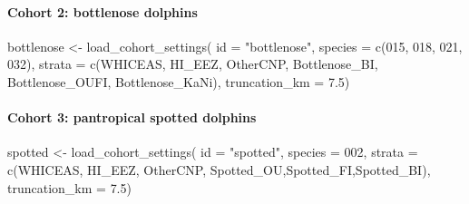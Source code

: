 \documentclass[
]{book}
\newenvironment{Shaded}{\begin{snugshade}}{\end{snugshade}}
\newcommand{\AttributeTok}[1]{\textcolor[rgb]{0.77,0.63,0.00}{#1}}
\newcommand{\FloatTok}[1]{\textcolor[rgb]{0.00,0.00,0.81}{#1}}
\newcommand{\FunctionTok}[1]{\textcolor[rgb]{0.00,0.00,0.00}{#1}}
\newcommand{\NormalTok}[1]{#1}
\newcommand{\OtherTok}[1]{\textcolor[rgb]{0.56,0.35,0.01}{#1}}
\newcommand{\StringTok}[1]{\textcolor[rgb]{0.31,0.60,0.02}{#1}}
\begin{document}
\hypertarget{cohort-2-bottlenose-dolphins}{%
\paragraph*{Cohort 2: bottlenose dolphins}\label{cohort-2-bottlenose-dolphins}}

\begin{Shaded}
\begin{Highlighting}[]
\NormalTok{bottlenose }\OtherTok{\textless{}{-}} \FunctionTok{load\_cohort\_settings}\NormalTok{(}
  \AttributeTok{id =} \StringTok{"bottlenose"}\NormalTok{,}
  \AttributeTok{species =} \FunctionTok{c}\NormalTok{(}\StringTok{\textquotesingle{}015\textquotesingle{}}\NormalTok{, }\StringTok{\textquotesingle{}018\textquotesingle{}}\NormalTok{, }\StringTok{\textquotesingle{}021\textquotesingle{}}\NormalTok{, }\StringTok{\textquotesingle{}032\textquotesingle{}}\NormalTok{),}
  \AttributeTok{strata =} \FunctionTok{c}\NormalTok{(}\StringTok{\textquotesingle{}WHICEAS\textquotesingle{}}\NormalTok{, }\StringTok{\textquotesingle{}HI\_EEZ\textquotesingle{}}\NormalTok{, }\StringTok{\textquotesingle{}OtherCNP\textquotesingle{}}\NormalTok{,}
             \StringTok{\textquotesingle{}Bottlenose\_BI\textquotesingle{}}\NormalTok{, }\StringTok{\textquotesingle{}Bottlenose\_OUFI\textquotesingle{}}\NormalTok{, }\StringTok{\textquotesingle{}Bottlenose\_KaNi\textquotesingle{}}\NormalTok{),}
  \AttributeTok{truncation\_km =} \FloatTok{7.5}\NormalTok{)}
\end{Highlighting}
\end{Shaded}

\hypertarget{cohort-3-pantropical-spotted-dolphins}{%
\paragraph*{Cohort 3: pantropical spotted dolphins}\label{cohort-3-pantropical-spotted-dolphins}}

\begin{Shaded}
\begin{Highlighting}[]
\NormalTok{spotted }\OtherTok{\textless{}{-}} \FunctionTok{load\_cohort\_settings}\NormalTok{(}
  \AttributeTok{id =} \StringTok{"spotted"}\NormalTok{,}
  \AttributeTok{species =} \StringTok{\textquotesingle{}002\textquotesingle{}}\NormalTok{,}
  \AttributeTok{strata =} \FunctionTok{c}\NormalTok{(}\StringTok{\textquotesingle{}WHICEAS\textquotesingle{}}\NormalTok{, }\StringTok{\textquotesingle{}HI\_EEZ\textquotesingle{}}\NormalTok{, }\StringTok{\textquotesingle{}OtherCNP\textquotesingle{}}\NormalTok{,}
             \StringTok{\textquotesingle{}Spotted\_OU\textquotesingle{}}\NormalTok{,}\StringTok{\textquotesingle{}Spotted\_FI\textquotesingle{}}\NormalTok{,}\StringTok{\textquotesingle{}Spotted\_BI\textquotesingle{}}\NormalTok{),}
  \AttributeTok{truncation\_km =} \FloatTok{7.5}\NormalTok{)}
\end{Highlighting}
\end{Shaded}
\end{document}
